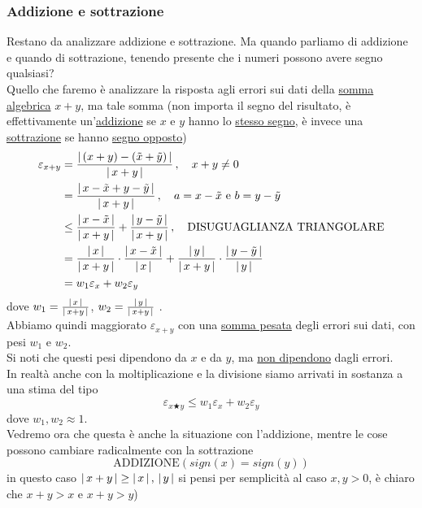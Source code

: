 \documentclass[12pt]{article}
\DeclarePairedDelimiter{\abs}{\lvert}{\rvert}
\begin{document}
\subsubsection{Addizione e sottrazione}
Restano da analizzare addizione e sottrazione. Ma quando parliamo di addizione e quando di sottrazione, tenendo presente che i numeri possono avere segno qualsiasi?\\
Quello che faremo è analizzare la risposta agli errori sui dati della \uline{somma algebrica} $x + y$, ma tale somma (non importa il segno del risultato, è effettivamente un'\uline{addizione} se $x$ e $y$ hanno lo \uline{stesso segno}, è invece una \uline{sottrazione} se hanno \uline{segno opposto})
\[\begin{split}
    \varepsilon_{x+y} & = \frac{\abs*{\,(x + y) - (\Tilde{x} + \Tilde{y})\,}}{\abs*{\,x + y\,}} \,, \quad x + y \ne 0 \\
    & = \frac{\abs*{\,x - \Tilde{x} + y - \Tilde{y}\,}}{\abs*{\,x + y\,}} \,, \quad a = x - \Tilde{x} \text{ e } b = y - \Tilde{y} \\
    & \le \frac{\abs*{\,x - \Tilde{x}\,}}{\abs*{\,x + y\,}} + \frac{\abs*{\,y - \Tilde{y}\,}}{\abs*{\,x + y\,}} \,, \quad \text{DISUGUAGLIANZA TRIANGOLARE} \\
    & = \frac{\abs*{\,x\,}}{\abs*{\,x + y\,}} \cdot \frac{\abs*{\,x - \Tilde{x}\,}}{\abs*{\,x\,}} + \frac{\abs*{\,y\,}}{\abs*{\,x + y\,}} \cdot \frac{\abs*{\,y - \Tilde{y}\,}}{\abs*{\,y\,}} \\
    & = w_1 \varepsilon_x + w_2 \varepsilon_y
\end{split}\]
dove $w_1 = \frac{\abs*{\,x\,}}{\abs*{\,x + y\,}}$, $w_2 = \frac{\abs*{\,y\,}}{\abs*{\,x + y\,}}$ .\\
Abbiamo quindi maggiorato $\varepsilon_{x+y}$ con una \uline{somma pesata} degli errori sui dati, con pesi $w_1$ e $w_2$.\\
Si noti che questi pesi dipendono da $x$ e da $y$, ma \uline{non dipendono} dagli errori.\\
In realtà anche con la moltiplicazione e la divisione siamo arrivati in sostanza a una stima del tipo
\[\varepsilon_{x \bigstar y} \le w_1 \varepsilon_x + w_2 \varepsilon_y\]
dove $w_1, w_2 \approx 1$. \\
Vedremo ora che questa è anche la situazione con l’addizione, mentre le cose possono cambiare radicalmente con la sottrazione \\
\[\text{ADDIZIONE} (sign(x) = sign(y))\]
in questo caso $\abs{\,x + y\,} \ge \abs{\,x\,}\,,\,\abs{\,y\,}$ si pensi per semplicità al caso $x,y > 0$, è chiaro che $x + y > x$ e $x + y > y$) \\
\end{document}
